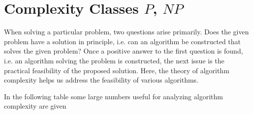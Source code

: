 \section{Complexity Classes $P$, $NP$}

When solving a particular problem, two questions arise primarily. Does the given problem have a solution in principle, i.e. can an algorithm be constructed that solves the given problem? Once a positive answer to the first question is found, i.e. an algorithm solving the problem is constructed, the next issue is the practical feasibility of the proposed solution. Here, the theory of algorithm complexity helps us address the feasibility of various algorithms.

In the following table \cite{bSchneier} 
some large numbers useful for analyzing algorithm complexity are given
